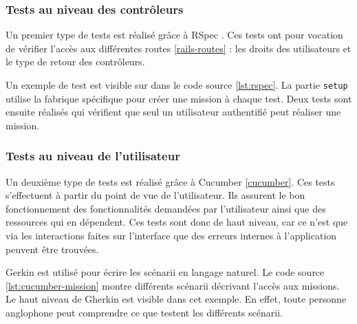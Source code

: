 \subsubsection{Tests au niveau des contrôleurs}
Un premier type de tests est réalisé grâce à RSpec \cite{rspec}. Ces tests ont pour vocation de vérifier l'accès aux différentes routes \ref{rails-routes} : les droits des utilisateurs et le type de retour des contrôleurs.

Un exemple de test est visible sur dans le code source \ref{lst:rspec}. La partie \texttt{setup} utilise la fabrique spécifique pour créer une \gls{mission} à chaque test. Deux tests sont ensuite réalisés qui vérifient que seul un utilisateur authentifié peut réaliser une \gls{mission}.

\begin{figure}

\end{figure}

\subsubsection{Tests au niveau de l'utilisateur}
Un deuxième type de tests est réalisé grâce à Cucumber \ref{cucumber}. Ces tests s'effectuent à partir du point de vue de l'utilisateur. Ils assurent le bon fonctionnement des fonctionnalités demandées par l'utilisateur ainsi que des ressources qui en dépendent. Ces tests sont donc de haut niveau, car ce n'est que via les interactions faites sur l'interface que des erreurs internes à l'application peuvent être trouvées.

\begin{figure}

\end{figure}

\begin{figure}

\end{figure}

Gerkin est utilisé pour écrire les scénarii en langage naturel.
Le code source \ref{lst:cucumber-mission} montre différents scénarii décrivant l'accès aux \glspl{mission}. Le haut niveau de Gherkin est visible dans cet exemple. En effet, toute personne anglophone peut comprendre ce que testent les différents scénarii.


